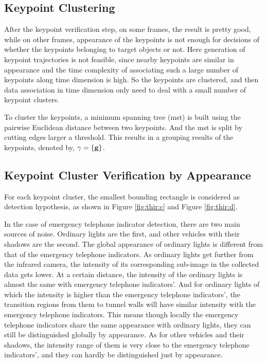 \subsection{Keypoint Clustering}
After the keypoint verification step, on some frames, the result is pretty good, while on other frames, appearance of the keypoints is not enough for decisions of whether the keypoints belonging to target objects or not. Here generation of keypoint trajectories is not feasible, since nearby keypoints are similar in appearance and  the time complexity of associating such a large number of keypoints along time dimension is high. So the keypoints are clustered, and then data association in time dimension only need to deal with a small number of keypoint clusters.

To cluster the keypoints, a minimum spanning tree (mst) is built using the pairwise Euclidean distance between two keypoints. And the mst is split by cutting edges larger a threshold. This results in a grouping results of the keypoints, denoted by, $\gamma=\{\bf{g}\}$.


\subsection{Keypoint Cluster Verification by Appearance}

For each keypoint cluster, the smallest bounding rectangle is considered as detection hypothesis, as shown in Figure \ref{fig:thir:c} and Figure \ref{fig:thir:d}. 

In the case of emergency telephone indicator detection, there are two main sources of noise. Ordinary lights are the first, and other vehicles with their shadows are the second. The global appearance of ordinary lights is different from that of the emergency telephone indicators. As ordinary lights get further from the infrared camera, the intensity of its corresponding sub-image in the collected data gets lower. At a certain distance, the intensity of the ordinary  lights is almost the same with emergency telephone indicators'. And for ordinary lights of which the intensity is higher than the emergency telephone indicators', the transition regions from them to tunnel walls will have similar intensity with the emergency telephone indicators.
This means though locally the emergency telephone indicators share the same appearance with ordinary lights, they can still be distinguished globally by appearance. As for other vehicles and their shadows, the intensity range of them is very close to the emergency telephone indicators', and they can hardly be distinguished just by appearance.



